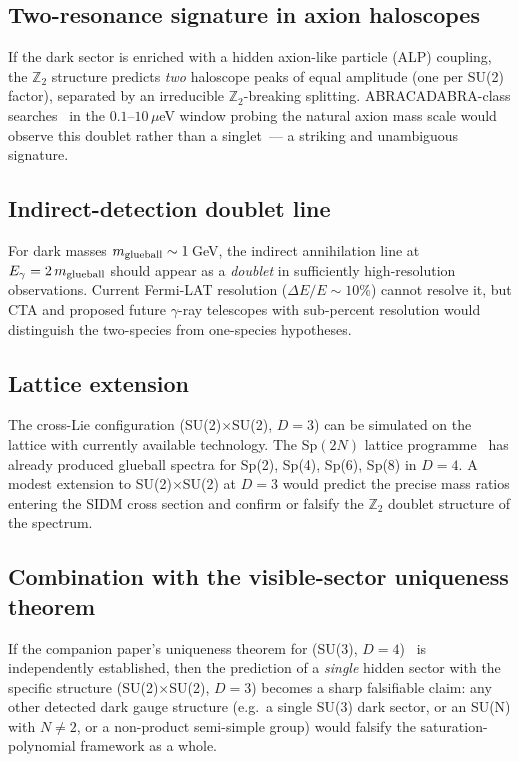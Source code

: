\documentclass[aps,prd,twocolumn,nofootinbib,superscriptaddress,floatfix]{revtex4-2}
\begin{document}
\subsection{Two-resonance signature in axion haloscopes}
If the dark sector is enriched with a hidden axion-like particle (ALP) coupling, the $\mathbb{Z}_2$ structure predicts \emph{two} haloscope peaks of equal amplitude (one per SU(2) factor), separated by an irreducible $\mathbb{Z}_2$-breaking splitting. ABRACADABRA-class searches~\cite{Kahn2016} in the $0.1$--$10\,\mu$eV window probing the natural axion mass scale would observe this doublet rather than a singlet~--- a striking and unambiguous signature.

\subsection{Indirect-detection doublet line}
For dark masses $m_{\rm glueball}\sim 1\,$GeV, the indirect annihilation line at $E_\gamma=2\,m_{\rm glueball}$ should appear as a \emph{doublet} in sufficiently high-resolution observations. Current Fermi-LAT resolution ($\Delta E/E\sim 10\%$) cannot resolve it, but CTA and proposed future $\gamma$-ray telescopes with sub-percent resolution would distinguish the two-species from one-species hypotheses.

\subsection{Lattice extension}
The cross-Lie configuration (SU(2)$\times$SU(2), $D=3$) can be simulated on the lattice with currently available technology. The Sp$(2N)$ lattice programme~\cite{Bennett2020} has already produced glueball spectra for Sp(2), Sp(4), Sp(6), Sp(8) in $D=4$. A modest extension to SU(2)$\times$SU(2) at $D=3$ would predict the precise mass ratios entering the SIDM cross section and confirm or falsify the $\mathbb{Z}_2$ doublet structure of the spectrum.

\subsection{Combination with the visible-sector uniqueness theorem}
If the companion paper's uniqueness theorem for (SU(3), $D=4$)~\cite{Remondiere2026companion} is independently established, then the prediction of a \emph{single} hidden sector with the specific structure (SU(2)$\times$SU(2), $D=3$) becomes a sharp falsifiable claim: any other detected dark gauge structure (e.g.\ a single SU(3) dark sector, or an SU(N) with $N\neq 2$, or a non-product semi-simple group) would falsify the saturation-polynomial framework as a whole.
\end{document}
